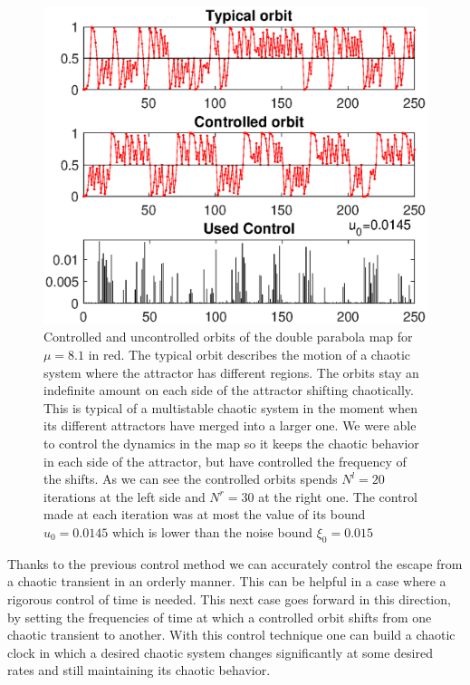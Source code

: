 \begin{figure}
    \centering
    \includegraphics[width=0.7\textheight]{Images/P1/Alt_tray_mu8.1.eps}
    \caption{Controlled and uncontrolled orbits of the double parabola map for $\mu = 8.1$ in red. The typical orbit describes the motion of a chaotic system where the attractor has different regions. The orbits stay an indefinite amount on each side of the attractor shifting chaotically. This is typical of a multistable chaotic system in the moment when its different attractors have merged into a larger one. We were able to control the dynamics in the map so it keeps the chaotic behavior in each side of the attractor, but have controlled the frequency of the shifts. As we can see the controlled orbits spends $N^l = 20$ iterations at the left side and $N^r = 30$ at the right one. The control made at each iteration was at most the value of its bound $u_0 = 0.0145$ which is lower than the noise bound $\xi_0 = 0.015$}
    \label{fig:TrajectoryDouble}
\end{figure}

 

Thanks to the previous control method we can accurately control the escape from a chaotic transient in an orderly manner. This can be helpful in a case where a rigorous control of time is needed. This next case goes forward in this direction, by setting the frequencies of time at which a controlled orbit shifts from one chaotic transient to another. With this control technique one can build a chaotic clock in which a desired chaotic system changes significantly at some desired rates and still maintaining its chaotic behavior. 

